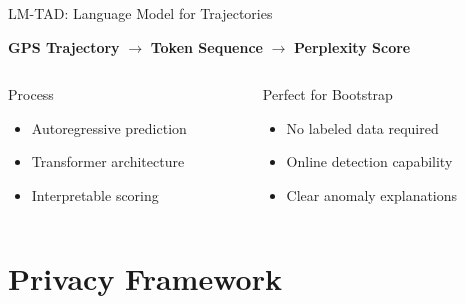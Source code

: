 \documentclass[aspectratio=169,xcolor={dvipsnames}]{beamer}
\begin{document}
\begin{frame}{LM-TAD: Language Model for Trajectories}
  \begin{block}{}
    \centering
    \Large \textbf{GPS Trajectory} $\rightarrow$ \textbf{Token Sequence} $\rightarrow$ \textbf{Perplexity Score}
  \end{block}
  
  \vspace{1em}
  \begin{columns}[T,onlytextwidth]
    \begin{column}{0.48\textwidth}
      \begin{block}{Process}
        \begin{itemize}
          \item Autoregressive prediction
          \item Transformer architecture
          \item Interpretable scoring
        \end{itemize}
      \end{block}
    \end{column}
    \hspace{0.04\textwidth}
    \begin{column}{0.48\textwidth}
      \begin{block}{Perfect for Bootstrap}
        \begin{itemize}
          \item No labeled data required
          \item Online detection capability
          \item Clear anomaly explanations
        \end{itemize}
      \end{block}
    \end{column}
  \end{columns}
\end{frame}

\section{Privacy Framework}
\end{document}
